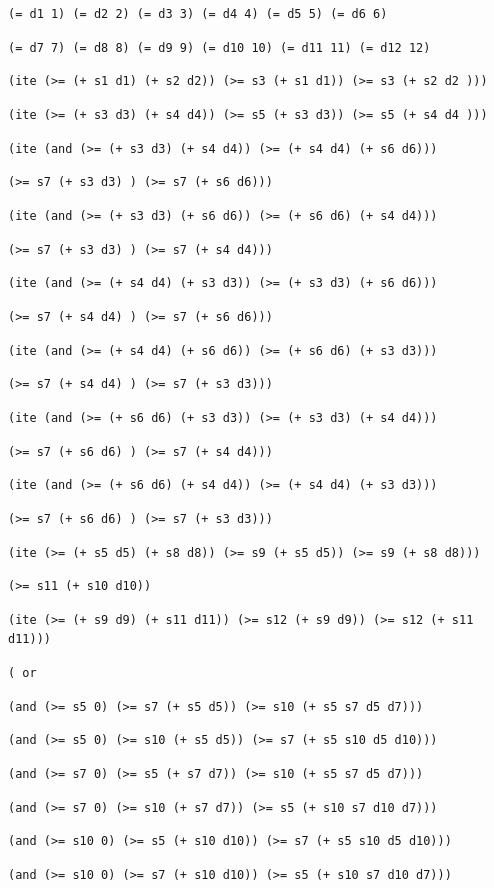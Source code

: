\documentclass[11pt]{article}
\begin{document}
{\tt (= d1 1) (= d2 2) (= d3 3) (= d4 4) (= d5 5) (= d6 6)}

{\tt (= d7 7) (= d8 8) (= d9 9) (= d10 10) (= d11 11) (= d12 12)}

{\tt (ite (>= (+ s1 d1) (+ s2 d2))  (>= s3 (+ s1 d1))  (>= s3 (+ s2 d2 )))}

{\tt (ite (>= (+ s3 d3) (+ s4 d4))  (>= s5 (+ s3 d3))  (>= s5 (+ s4 d4 )))}

{\tt (ite (and (>= (+ s3 d3) (+ s4 d4)) (>= (+ s4 d4) (+ s6 d6))) }

{\tt (>= s7 (+ s3 d3) ) (>= s7 (+ s6 d6)))}

{\tt (ite (and (>= (+ s3 d3) (+ s6 d6)) (>= (+ s6 d6) (+ s4 d4)))}

{\tt (>= s7 (+ s3 d3) ) (>= s7 (+ s4 d4)))}

{\tt (ite (and (>= (+ s4 d4) (+ s3 d3)) (>= (+ s3 d3) (+ s6 d6))) }

{\tt (>= s7 (+ s4 d4) ) (>= s7 (+ s6 d6)))}

{\tt (ite (and (>= (+ s4 d4) (+ s6 d6)) (>= (+ s6 d6) (+ s3 d3))) }

{\tt (>= s7 (+ s4 d4) ) (>= s7 (+ s3 d3)))}

{\tt (ite (and (>= (+ s6 d6) (+ s3 d3)) (>= (+ s3 d3) (+ s4 d4))) }

{\tt (>= s7 (+ s6 d6) ) (>= s7 (+ s4 d4)))}

{\tt (ite (and (>= (+ s6 d6) (+ s4 d4)) (>= (+ s4 d4) (+ s3 d3))) }

{\tt (>= s7 (+ s6 d6) ) (>= s7 (+ s3 d3)))}

{\tt (ite (>= (+ s5 d5) (+ s8 d8)) (>= s9 (+ s5 d5)) (>= s9 (+ s8 d8)))}

{\tt (>= s11 (+ s10 d10))}

{\tt (ite (>= (+ s9 d9) (+ s11 d11)) (>= s12 (+ s9 d9)) (>= s12 (+ s11 d11)))}

{\tt ( or}

{\tt (and (>= s5 0) (>= s7 (+ s5 d5)) (>= s10 (+ s5 s7 d5 d7)))}

{\tt (and (>= s5 0) (>= s10 (+ s5 d5)) (>= s7 (+ s5 s10 d5 d10)))}

{\tt (and (>= s7 0) (>= s5 (+ s7 d7)) (>= s10 (+ s5 s7 d5 d7)))}

{\tt (and (>= s7 0) (>= s10 (+ s7 d7)) (>= s5 (+ s10 s7 d10 d7)))}

{\tt (and (>= s10 0) (>= s5 (+ s10 d10)) (>= s7 (+ s5 s10 d5 d10)))}

{\tt (and (>= s10 0) (>= s7 (+ s10 d10)) (>= s5 (+ s10 s7 d10 d7)))}
\end{document}
